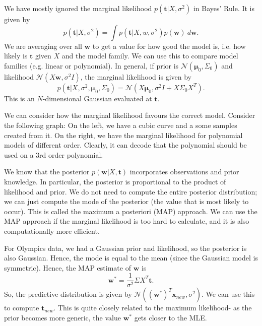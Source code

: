 \documentclass[a4paper, openany]{memoir}
\begin{document}
    We have mostly ignored the marginal likelihood $p(\mathbf{t}|X, \sigma^2)$ in Bayes' Rule. It is given by
    \[p(\mathbf{t}|X, \sigma^2) = \int p(\mathbf{t}|X, w, \sigma^2) p(\mathbf{w}) \ d\mathbf{w}.\]
    We are averaging over all $\mathbf{w}$ to get a value for how good the model is, i.e. how likely is $\mathbf{t}$ given $X$ and the model family. We can use this to compare model families (e.g. linear or polynomial). In general, if prior is $\mathcal{N}(\mathbf{\mu}_0, \Sigma_0)$ and likelihood $\mathcal{N}(X\mathbf{w}, \sigma^2I)$, the marginal likelihood is given by
    \[p(\mathbf{t}|X, \sigma^2, \mathbf{\mu}_0, \Sigma_0) = \mathcal{N}(X\mathbf{\mu}_0, \sigma^2 I + X \Sigma_0 X^T).\]
    This is an $N$-dimensional Gaussian evaluated at $\mathbf{t}$.

    We can consider how the marginal likelihood favours the correct model. Consider the following graph:
    On the left, we have a cubic curve and a some samples created from it. On the right, we have the marginal likelihood for polynomial models of different order. Clearly, it can decode that the polynomial should be used on a 3rd order polynomial.

    We know that the posterior $p(\mathbf{w}|X, \mathbf{t})$ incorporates observations and prior knowledge. In particular, the posterior is proportional to the product of likelihood and prior. We do not need to compute the entire posterior distribution; we can just compute the mode of the posterior (the value that is most likely to occur). This is called the maximum a posteriori (MAP) approach. We can use the MAP approach if the marginal likelihood is too hard to calculate, and it is also computationally more efficient.

    For Olympics data, we had a Gaussian prior and likelihood, so the posterior is also Gaussian. Hence, the mode is equal to the mean (since the Gaussian model is symmetric). Hence, the MAP estimate of $\mathbf{w}$ is
    \[\mathbf{w}^* = \frac{1}{\sigma^2} \Sigma X^T \mathbf{t}.\]
    So, the predictive distribution is given by $\mathcal{N}((\mathbf{w}^*)^T \mathbf{x}_{new}, \sigma^2)$. We can use this to compute $\mathbf{t}_{new}$. This is quite closely related to the maximum likelihood- as the prior becomes more generic, the value $\mathbf{w}^*$ gets closer to the MLE.
\end{document}
